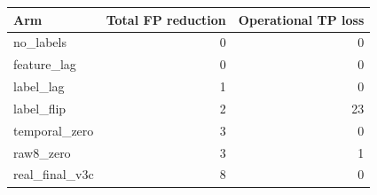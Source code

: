 \begin{tabular}{lrr}
\toprule
Arm & Total FP reduction & Operational TP loss \\
\midrule
no\_labels & 0 & 0 \\
feature\_lag & 0 & 0 \\
label\_lag & 1 & 0 \\
label\_flip & 2 & 23 \\
temporal\_zero & 3 & 0 \\
raw8\_zero & 3 & 1 \\
real\_final\_v3c & 8 & 0 \\
\bottomrule
\end{tabular}

